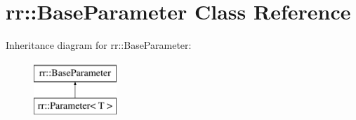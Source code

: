 \hypertarget{classrr_1_1_base_parameter}{\section{rr\-:\-:Base\-Parameter Class Reference}
\label{classrr_1_1_base_parameter}
}
Inheritance diagram for rr\-:\-:Base\-Parameter\-:\begin{figure}[H]
\begin{center}
\leavevmode
\includegraphics[height=2.000000cm]{classrr_1_1_base_parameter}
\end{center}
\end{figure}
